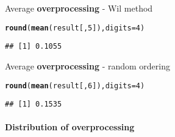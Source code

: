 \documentclass{article}\usepackage[]{graphicx}\usepackage[]{color}
\makeatletter
\newcommand{\hlnum}[1]{\textcolor[rgb]{0.686,0.059,0.569}{#1}}%
\newcommand{\hlstd}[1]{\textcolor[rgb]{0.345,0.345,0.345}{#1}}%
\newcommand{\hlkwc}[1]{\textcolor[rgb]{0.333,0.667,0.333}{#1}}%
\newcommand{\hlkwd}[1]{\textcolor[rgb]{0.737,0.353,0.396}{\textbf{#1}}}%
\newenvironment{kframe}{%
 \def\at@end@of@kframe{}%
 \ifinner\ifhmode%
  \def\at@end@of@kframe{\end{minipage}}%
  \begin{minipage}{\columnwidth}%
 \fi\fi%
 \def\FrameCommand##1{\hskip\@totalleftmargin \hskip-\fboxsep
 \colorbox{shadecolor}{##1}\hskip-\fboxsep
     \hskip-\linewidth \hskip-\@totalleftmargin \hskip\columnwidth}%
 \MakeFramed {\advance\hsize-\width
   \@totalleftmargin\z@ \linewidth\hsize
   \@setminipage}}%
 {\par\unskip\endMakeFramed%
 \at@end@of@kframe}
\newenvironment{knitrout}{}{} %
\makeatother
\begin{document}
Average \textbf{overprocessing} - Wil method

\begin{knitrout}
\color{fgcolor}\begin{kframe}
\begin{alltt}
\hlkwd{round}\hlstd{(}\hlkwd{mean}\hlstd{(result[,}\hlnum{5}\hlstd{]),}\hlkwc{digits} \hlstd{=} \hlnum{4}\hlstd{)}
\end{alltt}
\begin{verbatim}
## [1] 0.1055
\end{verbatim}
\end{kframe}
\end{knitrout}

Average \textbf{overprocessing} - random ordering

\begin{knitrout}
\color{fgcolor}\begin{kframe}
\begin{alltt}
\hlkwd{round}\hlstd{(}\hlkwd{mean}\hlstd{(result[,}\hlnum{6}\hlstd{]),}\hlkwc{digits} \hlstd{=} \hlnum{4}\hlstd{)}
\end{alltt}
\begin{verbatim}
## [1] 0.1535
\end{verbatim}
\end{kframe}
\end{knitrout}

\paragraph{Distribution of overprocessing}
\end{document}
